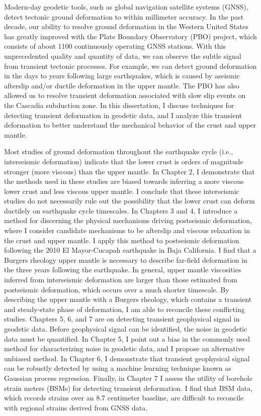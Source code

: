 
Modern-day geodetic tools, such as global navigation satellite systems
(GNSS), detect tectonic ground deformation to within millimeter
accuracy. In the past decade, our ability to resolve ground
deformation in the Western United States has greatly improved with the
Plate Boundary Observatory (PBO) project, which consists of about 1100
continuously operating GNSS stations. With this unprecedented quality
and quantity of data, we can observe the subtle signal from transient
tectonic processes. For example, we can detect ground deformation in
the days to years following large earthquakes, which is caused by
aseismic afterslip and/or ductile deformation in the upper mantle. The
PBO has also allowed us to resolve transient deformation associated
with slow slip events on the Cascadia subduction zone. In this
dissertation, I discuss techniques for detecting transient deformation
in geodetic data, and I analyze this transient deformation to better
understand the mechanical behavior of the crust and upper mantle.

Most studies of ground deformation throughout the earthquake cycle
(i.e., interseismic deformation) indicate that the lower crust is
orders of magnitude stronger (more viscous) than the upper mantle. In
Chapter 2, I demonstrate that the methods used in these studies are
biased towards inferring a more viscous lower crust and less viscous
upper mantle. I conclude that these interseismic studies do not
necessarily rule out the possibility that the lower crust can deform
ductilely on earthquake cycle timescales. In Chapters 3 and 4, I
introduce a method for discerning the physical mechanisms driving
postseismic deformation, where I consider candidate mechanisms to be
afterslip and viscous relaxation in the crust and upper mantle. I
apply this method to postseismic deformation following the 2010 El
Mayor-Cucapah earthquake in Baja California. I find that a Burgers
rheology upper mantle is necessary to describe far-field deformation
in the three years following the earthquake. In general, upper mantle
viscosities inferred from interseismic deformation are larger than
those estimated from postseismic deformation, which occurs over a much
shorter timescale. By describing the upper mantle with a Burgers
rheology, which contains a transient and steady-state phase of
deformation, I am able to reconcile these conflicting studies.
Chapters 5, 6, and 7 are on detecting transient geophysical signal in
geodetic data. Before geophysical signal can be identified, the noise
in geodetic data must be quantified. In Chapter 5, I point out a bias
in the commonly used method for characterizing noise in geodetic data,
and I propose an alternative unbiased method. In Chapter 6, I
demonstrate that transient geophysical signal can be robustly detected
by using a machine learning technique known as Gaussian process
regression. Finally, in Chapter 7 I assess the utility of borehole
strain meters (BSMs) for detecting transient deformation. I find that
BSM data, which records strains over an 8.7 centimeter baseline, are
difficult to reconcile with regional strains derived from GNSS data.
